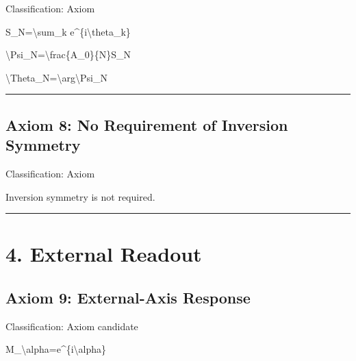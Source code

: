 \documentclass[
  a4paper]{article}
\newenvironment{Shaded}{}{}
\newcommand{\NormalTok}[1]{#1}
\begin{document}
Classification: Axiom

\begin{Shaded}
\begin{Highlighting}[]
\NormalTok{S\_N=\textbackslash{}sum\_k e\^{}\{i\textbackslash{}theta\_k\}}
\end{Highlighting}
\end{Shaded}

\begin{Shaded}
\begin{Highlighting}[]
\NormalTok{\textbackslash{}Psi\_N=\textbackslash{}frac\{A\_0\}\{N\}S\_N}
\end{Highlighting}
\end{Shaded}

\begin{Shaded}
\begin{Highlighting}[]
\NormalTok{\textbackslash{}Theta\_N=\textbackslash{}arg\textbackslash{}Psi\_N}
\end{Highlighting}
\end{Shaded}

\begin{center}\rule{0.5\linewidth}{0.5pt}\end{center}

\subsection{Axiom 8: No Requirement of Inversion
Symmetry}\label{axiom-8-no-requirement-of-inversion-symmetry}

Classification: Axiom

Inversion symmetry is not required.

\begin{center}\rule{0.5\linewidth}{0.5pt}\end{center}

\section{4. External Readout}\label{external-readout}

\subsection{Axiom 9: External-Axis
Response}\label{axiom-9-external-axis-response}

Classification: Axiom candidate

\begin{Shaded}
\begin{Highlighting}[]
\NormalTok{M\_\textbackslash{}alpha=e\^{}\{i\textbackslash{}alpha\}}
\end{Highlighting}
\end{Shaded}
\end{document}
